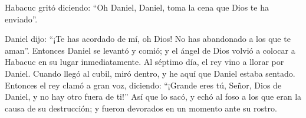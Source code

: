  Habacuc gritó diciendo: ``Oh Daniel, Daniel, toma la
cena que Dios te ha enviado''.

 Daniel dijo: ``¡Te has acordado de mí, oh Dios! No has
abandonado a los que te aman''.  Entonces Daniel se
levantó y comió; y el ángel de Dios volvió a colocar a Habacuc en su
lugar inmediatamente.  Al séptimo día, el rey vino a
llorar por Daniel. Cuando llegó al cubil, miró dentro, y he aquí que
Daniel estaba sentado.  Entonces el rey clamó a gran voz,
diciendo: ``¡Grande eres tú, Señor, Dios de Daniel, y no hay otro fuera
de ti!''  Así que lo sacó, y echó al foso a los que eran
la causa de su destrucción; y fueron devorados en un momento ante su
rostro.
